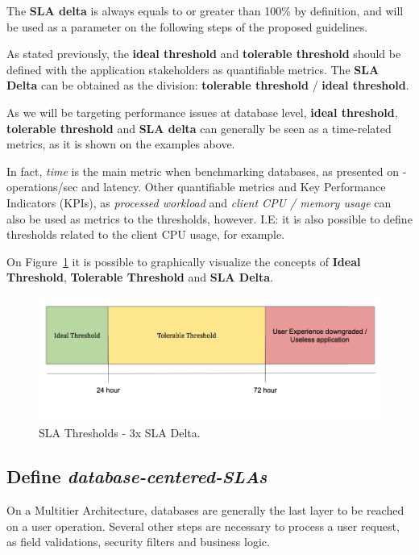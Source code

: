 The \textbf{SLA delta} is always equals to or greater than 100\% by definition, and will be used as a parameter on the following steps of the proposed guidelines.

As stated previously, the \textbf{ideal threshold} and \textbf{tolerable threshold} should be defined with the application stakeholders as quantifiable metrics. The \textbf{SLA Delta} can be obtained as the division: \textbf{tolerable threshold} / \textbf{ideal threshold}.

As we will be targeting performance issues at database level, \textbf{ideal threshold}, \textbf{tolerable threshold} and \textbf{SLA delta} can generally be seen as a time-related metrics, as it is shown on the examples above. 

In fact, \textit{time} is the main metric when benchmarking databases, as presented on \cite{datastaxbenchmark} - operations/sec and latency. Other quantifiable metrics and Key Performance Indicators (KPIs), as \textit{processed workload} and \textit{client CPU / memory usage} can also be used as metrics to the thresholds, however. I.E: it is also possible to define thresholds related to the client CPU usage, for example. 

On Figure~\ref{fig:thresholds} it is possible to graphically visualize the concepts of \textbf{Ideal Threshold}, \textbf{Tolerable Threshold} and \textbf{SLA Delta}.

\begin{figure}[ht!]
\centering
\includegraphics[width=120mm]{Imagens/thresholds.png}
\caption{SLA Thresholds - 3x SLA Delta. \label{fig:thresholds}}
\end{figure}


\subsection{Define \textbf{\textit{database-centered-SLAs}}}

On a Multitier Architecture, databases are generally the last layer to be reached on a user operation. Several other steps are necessary to process a user request, as field validations, security filters and business logic.

